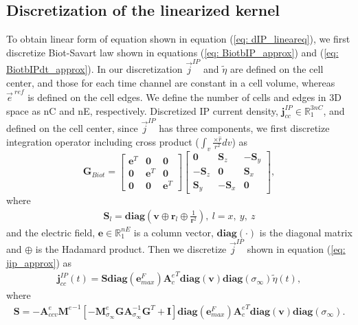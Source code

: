 \documentclass[a4paper, 11pt]{article}
\newcommand{\siginf}{\sigma_\infty}
\newcommand{\Ace}{{\mathbf A_c^e}}
\newcommand{\diag}{\mathbf{diag}}
\newcommand{\M}{{\mathbf M}}
\newcommand{\MeSigInf}{{\M^e_{\sigma_\infty}}}
\newcommand{\Me}{{\M^e}}
\renewcommand {\j}  { {\vec j} }
\newcommand {\e}  { {\vec e} }
\renewcommand {\dj}  { {\mathbf{j} } }
\newcommand {\de}  { {\mathbf{e} } }
\newcommand{\vol}{\mathbf{v}}
\newcommand{\A}{\mathbf{A}}
\newcommand{\peta}{\tilde{\eta}}
\newcommand{\eref}{\e^{\ ref}}
\begin{document}
\subsection{Discretization of the linearized kernel}
\label{section:linearkernel_discrete}
To obtain linear form of equation shown in equation (\ref{eq: dIP_lineareq}),
we first discretize Biot-Savart law shown in equations (\ref{eq: BiotbIP_approx}) and (\ref{eq: BiotbIPdt_approx}). In our discretization $\j^{IP}$ and  $\peta$ are defined on the cell center, and those for each time channel are constant in a cell volume, whereas $\eref$ is defined on the cell edges. 
We define the number of cells and edges in 3D space as nC and nE, respectively. Discretized IP current density, $\dj^{IP}_{cc} \in \mathbb{R}^{3nC}_{1}$, and defined on the cell center, since $\j^{IP}$ has three components, we first discretize integration operator including cross product ($\int_{v}\frac{ \times \hat{r}}{r^2}dv$) as
\begin{equation}
  \mathbf{G}_{Biot} =
  \begin{bmatrix}
       \mathbf{e}^T &  \mathbf{0}   & \mathbf{0}  \\
       \mathbf{0}   &  \mathbf{e}^T & \mathbf{0}  \\
       \mathbf{0}   &  \mathbf{0}   & \mathbf{e}^T
    \end{bmatrix}
  \begin{bmatrix}
       \mathbf{0}     &   \mathbf{S}_z   & -\mathbf{S}_y  \\
      -\mathbf{S}_z   &   \mathbf{0}     &  \mathbf{S}_x  \\
       \mathbf{S}_y   &  -\mathbf{S}_x   &  \mathbf{0}
    \end{bmatrix},
 \end{equation}
where
\begin{eqnarray*}
  \mathbf{S}_l =\diag(\mathbf{v}\oplus \mathbf{r}_l \oplus \frac{1}{\mathbf{r}^2}), \ l = x, \ y, \ z
\end{eqnarray*}
and the electric field, $\mathbf{e} \in \mathbb{R}^{nE}_1$ is a column vector, $\diag(\cdot)$ is the diagonal matrix and $\oplus$ is the Hadamard product. 
Then we discretize $\j^{IP}$ shown in equation (\ref{eq: jip_approx}) as
\begin{eqnarray}
  \dj^{IP}_{cc}(t) = \mathbf{S}\diag(\de^{F}_{max})\Ace^T\diag(\vol)\diag(\siginf)\peta(t),
\end{eqnarray}
where
\begin{eqnarray}
  \mathbf{S} = -\mathbf{A}^{e}_{ccv}\Me^{-1}[-\MeSigInf \mathbf{G} \A_{\siginf}^{-1}\mathbf{G}^T + \mathbf{I}] \diag(\de^{F}_{max})\Ace^T\diag(\vol)\diag(\siginf).
\end{eqnarray}
\end{document}
